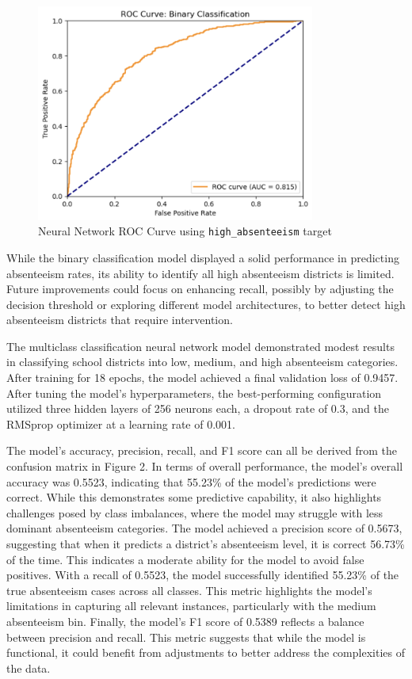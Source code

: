 \documentclass[
  11pt,
]{article}
\begin{document}
\begin{figure}[H]

{\centering \includegraphics[width=3.6in,height=\textheight]{../images/nn-roc.png}

}

\caption{Neural Network ROC Curve using \texttt{high\_absenteeism}
target}

\end{figure}%

While the binary classification model displayed a solid performance in
predicting absenteeism rates, its ability to identify all high
absenteeism districts is limited. Future improvements could focus on
enhancing recall, possibly by adjusting the decision threshold or
exploring different model architectures, to better detect high
absenteeism districts that require intervention.

The multiclass classification neural network model demonstrated modest
results in classifying school districts into low, medium, and high
absenteeism categories. After training for 18 epochs, the model achieved
a final validation loss of 0.9457. After tuning the model's
hyperparameters, the best-performing configuration utilized three hidden
layers of 256 neurons each, a dropout rate of 0.3, and the RMSprop
optimizer at a learning rate of 0.001.

The model's accuracy, precision, recall, and F1 score can all be derived
from the confusion matrix in Figure 2. In terms of overall performance,
the model's overall accuracy was 0.5523, indicating that 55.23\% of the
model's predictions were correct. While this demonstrates some
predictive capability, it also highlights challenges posed by class
imbalances, where the model may struggle with less dominant absenteeism
categories. The model achieved a precision score of 0.5673, suggesting
that when it predicts a district's absenteeism level, it is correct
56.73\% of the time. This indicates a moderate ability for the model to
avoid false positives. With a recall of 0.5523, the model successfully
identified 55.23\% of the true absenteeism cases across all classes.
This metric highlights the model's limitations in capturing all relevant
instances, particularly with the medium absenteeism bin. Finally, the
model's F1 score of 0.5389 reflects a balance between precision and
recall. This metric suggests that while the model is functional, it
could benefit from adjustments to better address the complexities of the
data.
\end{document}
